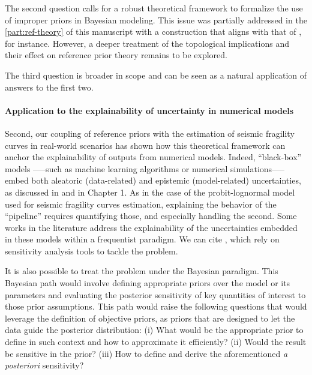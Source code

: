 The second question calls for a robust theoretical framework to formalize the use of improper priors in Bayesian modeling. This issue was partially addressed in the \cref{part:ref-theory} of this manuscript with a construction that aligns with that of \citet{bioche_approximation_2015}, for instance. However, a deeper treatment of the topological implications and their effect on reference prior theory remains to be explored.

The third question is broader in scope and can be seen as a natural application of answers to the first two. %



\paragraph{Application to the explainability of uncertainty in numerical models}

Second, our coupling of reference priors with the estimation of seismic fragility curves in real-world scenarios has shown how this theoretical framework can anchor the explainability of outputs from numerical models. Indeed, ``black-box'' models —--such as machine learning algorithms or numerical simulations—-- embed both aleatoric (data-related) and epistemic (model-related) uncertainties, as discussed in \cite{hullermeier_aleatoric_2019} and in Chapter 1.
As in the case of the probit-lognormal model used for seismic fragility curves estimation, explaining the behavior of the ``pipeline'' requires quantifying those, and especially handling the second. %
Some works in the literature address the explainability of the uncertainties embedded in these
models within a frequentist paradigm. We can cite
\cite{il_idrissi_quantile-constrained_2024,wimmer_quantifying_2023}, which rely on
sensitivity analysis tools to tackle the problem.

It is also possible to treat the problem under the Bayesian paradigm.
This Bayesian path would involve defining appropriate priors over the model or its parameters and evaluating the posterior sensitivity of key quantities of interest to those prior assumptions. This path would raise the following questions that would leverage the definition
of objective priors, as priors that are designed to let the data guide the posterior distribution:
(i) What would
be the appropriate prior to define in such context and how to approximate it efficiently? (ii) Would the result be 
sensitive in the prior? (iii) How to define and derive the aforementioned \emph{a posteriori} sensitivity?

